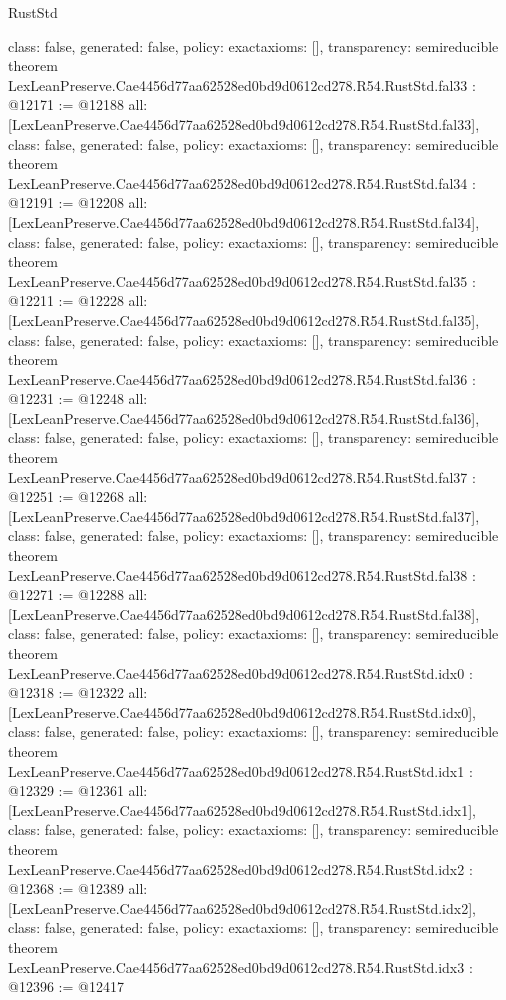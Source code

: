 \begin{lexlean}{RustStd}
\begin{coremodule}
{  class: false,
  generated: false,
  policy: exact{axioms: []},
  transparency: semireducible
}
theorem LexLeanPreserve.Cae4456d77aa62528ed0bd9d0612cd278.R54.RustStd.fal33 : @12171 := @12188 {
  all: [LexLeanPreserve.Cae4456d77aa62528ed0bd9d0612cd278.R54.RustStd.fal33],
  class: false,
  generated: false,
  policy: exact{axioms: []},
  transparency: semireducible
}
theorem LexLeanPreserve.Cae4456d77aa62528ed0bd9d0612cd278.R54.RustStd.fal34 : @12191 := @12208 {
  all: [LexLeanPreserve.Cae4456d77aa62528ed0bd9d0612cd278.R54.RustStd.fal34],
  class: false,
  generated: false,
  policy: exact{axioms: []},
  transparency: semireducible
}
theorem LexLeanPreserve.Cae4456d77aa62528ed0bd9d0612cd278.R54.RustStd.fal35 : @12211 := @12228 {
  all: [LexLeanPreserve.Cae4456d77aa62528ed0bd9d0612cd278.R54.RustStd.fal35],
  class: false,
  generated: false,
  policy: exact{axioms: []},
  transparency: semireducible
}
theorem LexLeanPreserve.Cae4456d77aa62528ed0bd9d0612cd278.R54.RustStd.fal36 : @12231 := @12248 {
  all: [LexLeanPreserve.Cae4456d77aa62528ed0bd9d0612cd278.R54.RustStd.fal36],
  class: false,
  generated: false,
  policy: exact{axioms: []},
  transparency: semireducible
}
theorem LexLeanPreserve.Cae4456d77aa62528ed0bd9d0612cd278.R54.RustStd.fal37 : @12251 := @12268 {
  all: [LexLeanPreserve.Cae4456d77aa62528ed0bd9d0612cd278.R54.RustStd.fal37],
  class: false,
  generated: false,
  policy: exact{axioms: []},
  transparency: semireducible
}
theorem LexLeanPreserve.Cae4456d77aa62528ed0bd9d0612cd278.R54.RustStd.fal38 : @12271 := @12288 {
  all: [LexLeanPreserve.Cae4456d77aa62528ed0bd9d0612cd278.R54.RustStd.fal38],
  class: false,
  generated: false,
  policy: exact{axioms: []},
  transparency: semireducible
}
theorem LexLeanPreserve.Cae4456d77aa62528ed0bd9d0612cd278.R54.RustStd.idx0 : @12318 := @12322 {
  all: [LexLeanPreserve.Cae4456d77aa62528ed0bd9d0612cd278.R54.RustStd.idx0],
  class: false,
  generated: false,
  policy: exact{axioms: []},
  transparency: semireducible
}
theorem LexLeanPreserve.Cae4456d77aa62528ed0bd9d0612cd278.R54.RustStd.idx1 : @12329 := @12361 {
  all: [LexLeanPreserve.Cae4456d77aa62528ed0bd9d0612cd278.R54.RustStd.idx1],
  class: false,
  generated: false,
  policy: exact{axioms: []},
  transparency: semireducible
}
theorem LexLeanPreserve.Cae4456d77aa62528ed0bd9d0612cd278.R54.RustStd.idx2 : @12368 := @12389 {
  all: [LexLeanPreserve.Cae4456d77aa62528ed0bd9d0612cd278.R54.RustStd.idx2],
  class: false,
  generated: false,
  policy: exact{axioms: []},
  transparency: semireducible
}
theorem LexLeanPreserve.Cae4456d77aa62528ed0bd9d0612cd278.R54.RustStd.idx3 : @12396 := @12417 {
}
\end{coremodule}
\end{lexlean}
